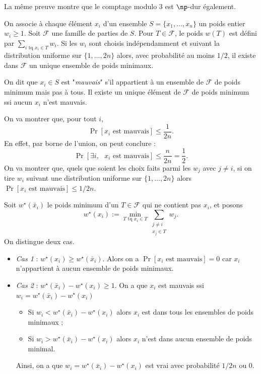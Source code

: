 \documentclass[./main]{subfiles}
\begin{document}
  \begin{rmk}
    La même preuve montre que le comptage modulo $3$ est $\np$-dur également.
  \end{rmk}

  \begin{lem}[d'isolation]
    On associe à chaque élément $x_i$ d'un ensemble $S = \{x_1, \ldots, x_n\} $ un poids entier $w_i \ge 1$.
    Soit $\mathcal{F}$ une famille de parties de $S$.
    Pour $T \in \mathcal{F}$, le poids $w(T)$ est défini par  $\sum_{i \text{ tq } x_i \in T} w_i$.
    Si les $w_i$ sont choisis indépendamment et suivant la distribution uniforme sur $\{1, \ldots, 2n\}$ alors, avec probabilité au moins $1/2$, il existe dans $\mathcal{F}$ un unique ensemble de poids minimaux.
  \end{lem}

  \begin{prv}
    On dit que $x_i \in S$ est "\textit{mauvais}" s'il appartient à un ensemble de $\mathcal{F}$ de poids minimum mais pas à tous.
    Il existe un unique élément de $\mathcal{F}$ de poids minimum ssi aucun $x_i$ n'est mauvais.

    On va montrer que, pour tout $i$, 
     \[
       \Pr[\text{$x_i$ est mauvais}] \le \frac{1}{2n}
    .\] 
    En effet, par borne de l'union, on peut conclure :
    \[
      \Pr[\exists i, \text{ $x_i$ est mauvais}] \le \frac{n}{2n} = \frac{1}{2}
    .\]
    On va montrer que, quels que soient les choix faits parmi les $w_j$ avec $j \neq i$, si on tire $w_i$ suivant une distribution uniforme sur $\{1, \ldots, 2n\}$ alors $\Pr[x_i \text{ est mauvais}] \le  1/2n$.

    Soit $w^\star(\bar{x}_i)$ le poids minimum d'un $T \in \mathcal{F}$ qui ne contient pas $x_i$, et posons
    \[
      w^\star(x_i) := \min_{T \text{ tq } x_i \in T} \sum_{\substack{j \neq i\\ x_j \in T}} w_j
    .\]
    On distingue deux cas.
    \begin{itemize}
      \item \textit{Cas 1} : $w^\star(x_i) \ge w^\star(\bar{x}_i)$.
        Alors on a $\Pr[x_i \text{ est mauvais}] = 0$ car $x_i$ n'appartient à aucun ensemble de poids minimaux.
      \item \textit{Cas 2} : $w^\star(\bar{x}_i) - w^\star(x_i) \ge 1$. On a que $x_i$ est mauvais ssi $w_i = w^\star(\bar{x}_i) - w^\star(x_i)$ 
        \begin{itemize}
          \item Si $w_i < w^\star(\bar{x}_i) - w^\star(x_i)$ alors $x_i$ est dans tous les ensembles de poids minimaux ;
          \item Si $w_i > w^\star(\bar{x}_i) - w^\star(x_i)$ alors $x_i$ n'est dans aucun ensemble de poids minimal.
        \end{itemize}
        Ainsi, on a que $w_i = w^\star(\bar{x}_i) - w^\star(x_i)$ est vrai avec probabilité $1/2n$ ou $0$.
    \end{itemize}
  \end{prv}
\end{document}
